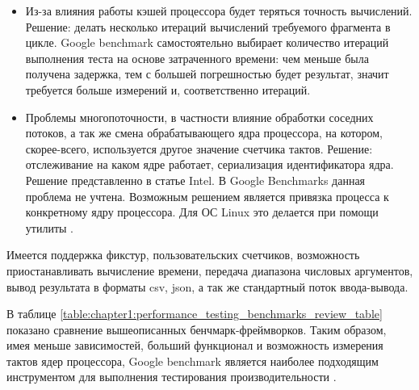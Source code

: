 \begin{description}[noitemsep]
	\begin{itemize}[noitemsep]
		\item Из-за влияния работы кэшей процессора будет теряться точность вычислений. Решение: делать несколько итераций вычислений требуемого фрагмента в цикле. Google benchmark самостоятельно выбирает количество итераций выполнения теста на основе затраченного времени: чем меньше была получена задержка, тем с большей погрешностью будет результат, значит требуется больше измерений и, соответственно итераций.
		\item Проблемы многопоточности, в частности влияние обработки соседних потоков, а так же смена обрабатывающего ядра процессора, на котором, скорее-всего, используется другое значение счетчика тактов. Решение: отслеживание на каком ядре работает, сериализация идентификатора ядра. Решение представленно в статье Intel\cite{paoloni2010benchmark}. В Google Benchmarks данная проблема не учтена. Возможным решением является привязка процесса к конкретному ядру процессора. Для ОС Linux это делается при помощи утилиты .
	\end{itemize}
	Имеется поддержка фикстур, пользовательских счетчиков, возможность приостанавливать вычисление времени, передача диапазона числовых аргументов, вывод результата в форматы csv, json, а так же стандартный поток ввода-вывода.
\end{description}

В таблице \ref{table:chapter1:performance_testing_benchmarks_review_table} показано сравнение вышеописанных бенчмарк-фреймворков. Таким образом, имея меньше зависимостей, больший функционал и возможность измерения тактов ядер процессора, Google benchmark является наиболее подходящим инструментом для выполнения тестирования производительности \marm{}.


